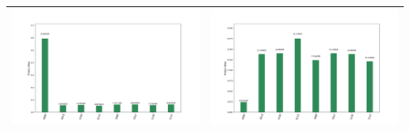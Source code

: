 \begin{landscape}
\begin{table}[ht]
\begin{tabular}{c c}
        \includegraphics[scale=0.32]{Grover_results/Grover_n=3,m=7.png} & \includegraphics[scale=0.32]{Grover_results/Grover_n=3,m=8.png} \\ \hline
    \end{tabular}
\end{table}
\end{landscape}

